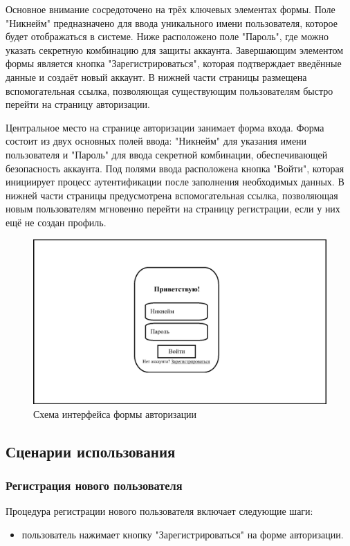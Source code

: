 Основное внимание сосредоточено на трёх ключевых элементах формы. Поле "Никнейм" предназначено для ввода уникального имени пользователя, которое будет отображаться в системе. Ниже расположено поле "Пароль", где можно указать секретную комбинацию для защиты аккаунта. Завершающим элементом формы является кнопка "Зарегистрироваться", которая подтверждает введённые данные и создаёт новый аккаунт. В нижней части страницы размещена вспомогательная ссылка, позволяющая существующим пользователям быстро перейти на страницу авторизации.

Центральное место на странице авторизации занимает форма входа. Форма состоит из двух основных полей ввода: "Никнейм" для указания имени пользователя и "Пароль" для ввода секретной комбинации, обеспечивающей безопасность аккаунта. Под полями ввода расположена кнопка "Войти", которая инициирует процесс аутентификации после заполнения необходимых данных. В нижней части страницы предусмотрена вспомогательная ссылка, позволяющая новым пользователям мгновенно перейти на страницу регистрации, если у них ещё не создан профиль.

\begin{figure}[ht]
	\centering
	\includegraphics[width=0.8\linewidth]{"images/UI макет авторизации"}
	\caption{Схема интерфейса формы авторизации}
	\label{fig:ui-auth}
\end{figure}

\subsection{Сценарии использования}

\subsubsection{Регистрация нового пользователя}  
Процедура регистрации нового пользователя включает следующие шаги:  
\begin{itemize}  
	\item пользователь нажимает кнопку "Зарегистрироваться" на форме авторизации. 
\end{itemize}

